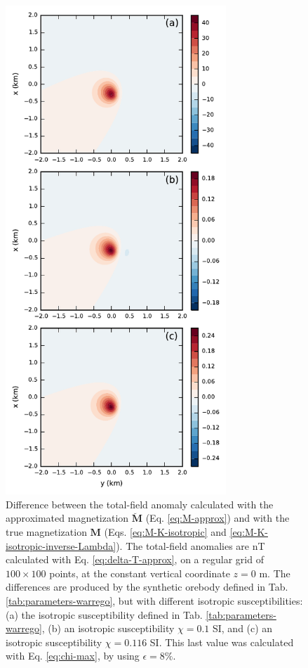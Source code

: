 \documentclass[gmd, manuscript]{copernicus}
\providecommand{\DIFadd}[1]{{\protect\color{blue}\uwave{#1}}} %
\providecommand{\DIFaddFL}[1]{\DIFadd{#1}} %
\providecommand{\DIFaddbeginFL}{} %
\providecommand{\DIFaddendFL}{} %
\begin{document}
\begin{figure}[t]
\includegraphics[width=8.3cm]{figures/field_differences.pdf}
\caption{Difference between the total-field
anomaly calculated with the approximated magnetization $\breve{\mathbf{M}}$
(Eq. \ref{eq:M-approx}) and with the
true magnetization $\mathbf{M}$
(Eqs. \ref{eq:M-K-isotropic} and \ref{eq:M-K-isotropic-inverse-Lambda}).
The total-field anomalies are \DIFaddbeginFL \DIFaddFL{in }\unit{nT} \DIFaddFL{and were
}\DIFaddendFL calculated with Eq. \ref{eq:delta-T-approx},
on a regular grid of $100 \times 100$ points,
at the constant vertical coordinate $z = 0$ \unit{m}.
The differences are produced by the synthetic orebody defined in
Tab. \ref{tab:parameters-warrego}, but with different
isotropic susceptibilities:
(a) the isotropic susceptibility defined in
Tab. \ref{tab:parameters-warrego},
(b) an isotropic susceptibility $\chi = 0.1$ \unit{SI}, and
(c) an isotropic susceptibility $\chi = 0.116$ \unit{SI}.
This last value was calculated
with Eq. \ref{eq:chi-max}, by using $\epsilon = 8 \%$.}
\label{fig:tfa-differences-warrego}
\end{figure}
\end{document}
